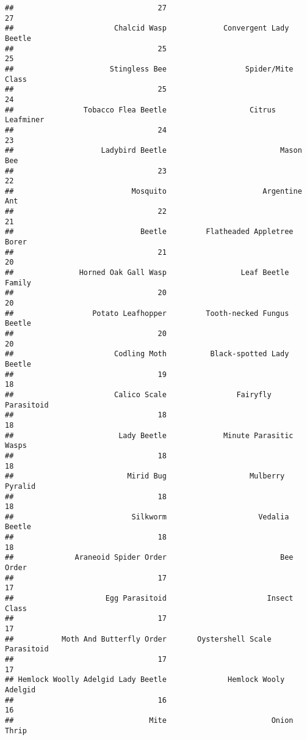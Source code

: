 \documentclass[
]{article}
\begin{document}
\begin{verbatim}
##                                 27                                 27 
##                       Chalcid Wasp             Convergent Lady Beetle 
##                                 25                                 25 
##                      Stingless Bee                  Spider/Mite Class 
##                                 25                                 24 
##                Tobacco Flea Beetle                   Citrus Leafminer 
##                                 24                                 23 
##                    Ladybird Beetle                          Mason Bee 
##                                 23                                 22 
##                           Mosquito                      Argentine Ant 
##                                 22                                 21 
##                             Beetle         Flatheaded Appletree Borer 
##                                 21                                 20 
##               Horned Oak Gall Wasp                 Leaf Beetle Family 
##                                 20                                 20 
##                  Potato Leafhopper         Tooth-necked Fungus Beetle 
##                                 20                                 20 
##                       Codling Moth          Black-spotted Lady Beetle 
##                                 19                                 18 
##                       Calico Scale                Fairyfly Parasitoid 
##                                 18                                 18 
##                        Lady Beetle             Minute Parasitic Wasps 
##                                 18                                 18 
##                          Mirid Bug                   Mulberry Pyralid 
##                                 18                                 18 
##                           Silkworm                     Vedalia Beetle 
##                                 18                                 18 
##              Araneoid Spider Order                          Bee Order 
##                                 17                                 17 
##                     Egg Parasitoid                       Insect Class 
##                                 17                                 17 
##           Moth And Butterfly Order       Oystershell Scale Parasitoid 
##                                 17                                 17 
## Hemlock Woolly Adelgid Lady Beetle              Hemlock Wooly Adelgid 
##                                 16                                 16 
##                               Mite                        Onion Thrip 

\end{verbatim}
\end{document}
